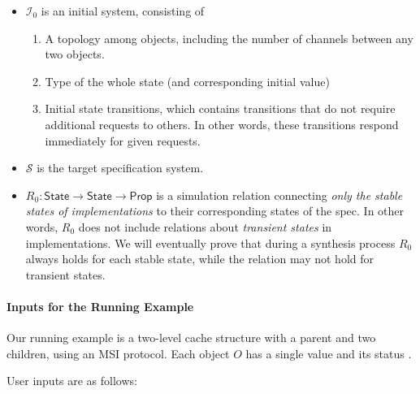 \documentclass[format=manuscript]{acmart}
\begin{document}
\begin{itemize}
\item $\mathcal{I}_0$ is an initial system, consisting of
  \begin{enumerate}
  \item A topology among objects, including the number of channels between any
    two objects.
  \item Type of the whole state (and corresponding initial value)
  \item Initial state transitions, which contains transitions that do not
    require additional requests to others. In other words, these transitions
    respond immediately for given requests.
  \end{enumerate}
\item $\mathcal{S}$ is the target specification system.
\item $R_0: \textsf{State} \to \textsf{State} \to \textsf{Prop}$ is a simulation
  relation connecting \emph{only the stable states of implementations} to their
  corresponding states of the spec. In other words, $R_0$ does not include
  relations about \emph{transient states} in implementations. We will eventually
  prove that during a synthesis process $R_0$ always holds for each stable
  state, while the relation may not hold for transient states.
\end{itemize}

\paragraph{Inputs for the Running Example}
Our running example is a two-level cache structure with a parent and two
children, using an MSI protocol. Each object $O$ has a single value 
and its status .

User inputs are as follows:
\end{document}
